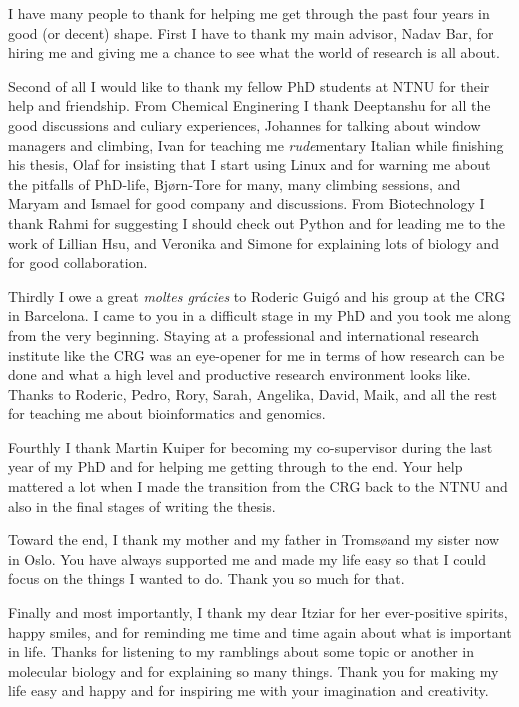 I have many people to thank for helping me get through the past four years in
good (or decent) shape. First I have to thank my main advisor, Nadav Bar, for
hiring me and giving me a chance to see what the world of research is all
about.

Second of all I would like to thank my fellow PhD students at NTNU for their
help and friendship. From Chemical Enginering I thank Deeptanshu for all the
good discussions and culiary experiences, Johannes for talking about window
managers and climbing, Ivan for teaching me \textit{rude}mentary Italian while
finishing his thesis, Olaf for insisting that I start using Linux and for
warning me about the pitfalls of PhD-life, Bjørn-Tore for many, many climbing
sessions, and Maryam and Ismael for good company and discussions. From
Biotechnology I thank Rahmi for suggesting I should check out Python and for
leading me to the work of Lillian Hsu, and Veronika and Simone for explaining
lots of biology and for good collaboration.

Thirdly I owe a great \textit{moltes grácies} to Roderic Guigó and his group at
the CRG in Barcelona. I came to you in a difficult stage in my PhD and you took
me along from the very beginning. Staying at a professional and international
research institute like the CRG was an eye-opener for me in terms of how
research can be done and what a high level and productive research environment
looks like. Thanks to Roderic, Pedro, Rory, Sarah, Angelika, David, Maik, and
all the rest for teaching me about bioinformatics and genomics.

Fourthly I thank Martin Kuiper for becoming my co-supervisor during the last
year of my PhD and for helping me getting through to the end. Your help
mattered a lot when I made the transition from the CRG back to the NTNU and
also in the final stages of writing the thesis.

Toward the end, I thank my mother and my father in Troms\o and my sister now in
Oslo. You have always supported me and made my life easy so that I could focus
on the things I wanted to do. Thank you so much for that.

Finally and most importantly, I thank my dear Itziar for her ever-positive
spirits, happy smiles, and for reminding me time and time again about what is
important in life. Thanks for listening to my ramblings about some topic or
another in molecular biology and for explaining so many things. Thank you for
making my life easy and happy and for inspiring me with your imagination and
creativity.
